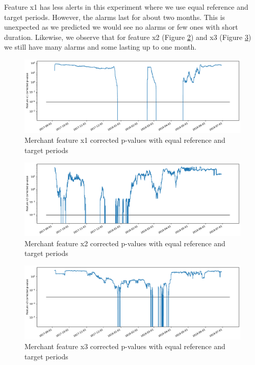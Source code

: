 Feature x1 has less alerts in this experiment where we use equal reference and target periods. However, the alarms last for about two months. This is unexpected as we predicted we would see no alarms or few ones with short duration. Likewise, we observe that for feature x2 (Figure \ref{fig:merchant2-x2-correctedpvalues}) and x3 (Figure \ref{fig:merchant2-x3-correctedpvalues}) we still have many alarms and some lasting up to one month.
\begin{figure}[!htb]
    \begin{center}
      \includegraphics[scale=0.5]{figures/merchant2-x1-correctedpvalues.pdf}
      \caption{Merchant feature x1 corrected p-values with equal reference and target periods}
      \label{fig:merchant2-x1-correctedpvalues}
    \end{center}
\end{figure}
\begin{figure}[!htb]
    \begin{center}
      \includegraphics[scale=0.5]{figures/merchant2-x2-correctedpvalues.pdf}
      \caption{Merchant feature x2 corrected p-values with equal reference and target periods}
      \label{fig:merchant2-x2-correctedpvalues}
    \end{center}
\end{figure}
\begin{figure}[!htb]
    \begin{center}
      \includegraphics[scale=0.5]{figures/merchant2-x3-correctedpvalues.pdf}
      \caption{Merchant feature x3 corrected p-values with equal reference and target periods}
      \label{fig:merchant2-x3-correctedpvalues}
    \end{center}
\end{figure}
